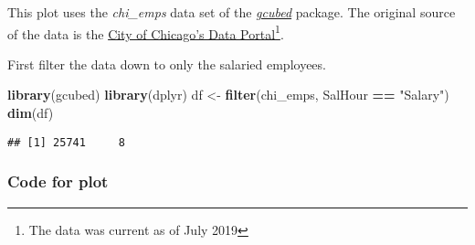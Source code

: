 \documentclass[]{book}
\newenvironment{Shaded}{\begin{snugshade}}{\end{snugshade}}
\newcommand{\DataTypeTok}[1]{\textcolor[rgb]{0.13,0.29,0.53}{#1}}
\newcommand{\DecValTok}[1]{\textcolor[rgb]{0.00,0.00,0.81}{#1}}
\newcommand{\FloatTok}[1]{\textcolor[rgb]{0.00,0.00,0.81}{#1}}
\newcommand{\KeywordTok}[1]{\textcolor[rgb]{0.13,0.29,0.53}{\textbf{#1}}}
\newcommand{\NormalTok}[1]{#1}
\newcommand{\OperatorTok}[1]{\textcolor[rgb]{0.81,0.36,0.00}{\textbf{#1}}}
\newcommand{\StringTok}[1]{\textcolor[rgb]{0.31,0.60,0.02}{#1}}
\let\rmarkdownfootnote\footnote%
\def\footnote{\protect\rmarkdownfootnote}
\begin{document}
This plot uses the \emph{chi\_emps} data set of the \protect\hyperlink{gcubed}{\emph{gcubed}} package.
The original source of the data is the \href{https://data.cityofchicago.org/Administration-Finance/Current-Employee-Names-Salaries-and-Position-Title/xzkq-xp2w}{City of Chicago's Data Portal}\footnote{The data was current as of July 2019}.

First filter the data down to only the salaried employees.

\begin{Shaded}
\begin{Highlighting}[]
\KeywordTok{library}\NormalTok{(gcubed)}
\KeywordTok{library}\NormalTok{(dplyr)}
\NormalTok{df <-}\StringTok{ }\KeywordTok{filter}\NormalTok{(chi_emps, SalHour }\OperatorTok{==}\StringTok{ "Salary"}\NormalTok{)}
\KeywordTok{dim}\NormalTok{(df)}
\end{Highlighting}
\end{Shaded}

\begin{verbatim}
## [1] 25741     8
\end{verbatim}

\hypertarget{chihistcode}{%
\subsubsection*{Code for plot}\label{chihistcode}}

\begin{Shaded}
\end{Shaded}
\end{document}
